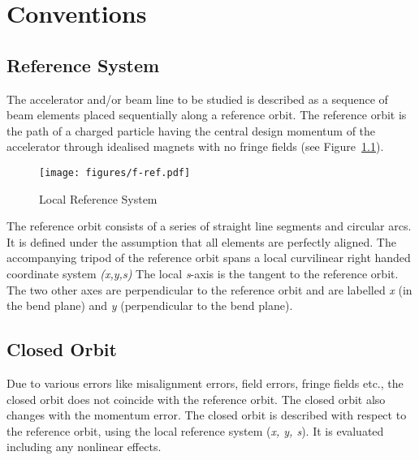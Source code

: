 
\chapter{Conventions}
\label{chap:conventions}


\section{Reference System}
\label{sec:reference}
The accelerator and/or beam line to be studied is described as a
sequence of beam elements placed sequentially along a reference
orbit. 
The reference orbit is the path of a charged particle having the
central design momentum of the accelerator through idealised magnets
with no fringe fields (see Figure~\ref{F-REF}).

\begin{figure}[htb]
\centering
\setlength{\unitlength}{1pt}
\texttt{[image: figures/f-ref.pdf]}
\caption[Local Reference System]{Local Reference System}
\label{F-REF}
\end{figure}  


The reference orbit consists of a series of straight line segments and
circular arcs. It is defined under the assumption that all elements are
perfectly aligned. The accompanying tripod of the reference orbit spans
a local curvilinear right handed coordinate system \textit{(x,y,s)} The
local \textit{s}-axis is the tangent to the reference orbit. The two
other axes are perpendicular to the reference orbit and are labelled
\textit{x} (in the bend plane) and \textit{y} (perpendicular to the bend
plane).  


\section{Closed Orbit}
\label{sec:closed-orbit}

Due to various errors like misalignment errors, field errors, fringe
fields etc., the closed orbit does not coincide with the reference
orbit. The closed orbit also changes with the momentum error. 
The closed orbit is described with respect to the reference orbit, using
the local reference system (\textit{x, y, s}). It is evaluated including
any nonlinear effects.  

